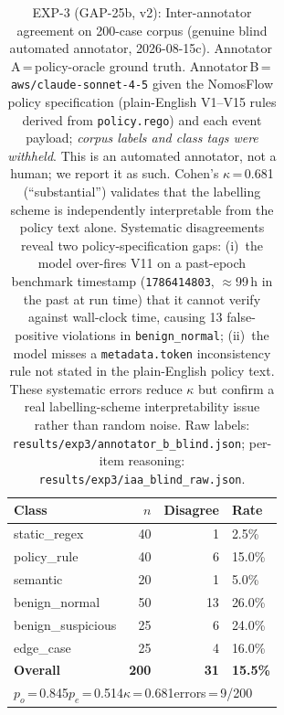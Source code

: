 \begin{table}[t]
\centering
\small
\caption{EXP-3 (GAP-25b, v2): Inter-annotator agreement on 200-case corpus
  (genuine blind automated annotator, 2026-08-15c).
  Annotator\,A\,=\,policy-oracle ground truth.
  Annotator\,B\,=\,\texttt{aws/claude-sonnet-4-5} given the NomosFlow policy
  specification (plain-English V1–V15 rules derived from \texttt{policy.rego})
  and each event payload; \emph{corpus labels and class tags were withheld}.
  This is an automated annotator, not a human; we report it as such.
  Cohen's $\kappa$\,=\,0.681 (``substantial'') validates that the labelling
  scheme is independently interpretable from the policy text alone.
  Systematic disagreements reveal two policy-specification gaps: (i)~the
  model over-fires V11 on a past-epoch benchmark timestamp
  (\texttt{1786414803}, $\approx$99\,h in the past at run time) that it
  cannot verify against wall-clock time, causing 13 false-positive violations
  in \texttt{benign\_normal}; (ii)~the model misses a \texttt{metadata.token}
  inconsistency rule not stated in the plain-English policy text.
  These systematic errors reduce $\kappa$ but confirm a real labelling-scheme
  interpretability issue rather than random noise.
  Raw labels: \texttt{results/exp3/annotator\_b\_blind.json};
  per-item reasoning: \texttt{results/exp3/iaa\_blind\_raw.json}.}
\label{tab:exp3-iaa}
\begin{tabular}{lrrl}
\hline
\textbf{Class} & \textbf{$n$} & \textbf{Disagree} & \textbf{Rate} \\
\hline
static\_regex      & 40 &  1 &  2.5\% \\
policy\_rule       & 40 &  6 & 15.0\% \\
semantic           & 20 &  1 &  5.0\% \\
benign\_normal     & 50 & 13 & 26.0\% \\
benign\_suspicious & 25 &  6 & 24.0\% \\
edge\_case         & 25 &  4 & 16.0\% \\
\hline
\textbf{Overall}   &\textbf{200}&\textbf{31}&\textbf{15.5\%} \\
\hline
\multicolumn{4}{l}{$p_o$\,=\,0.845\quad $p_e$\,=\,0.514\quad $\kappa$\,=\,0.681\quad errors\,=\,9/200} \\
\hline
\end{tabular}
\end{table}

